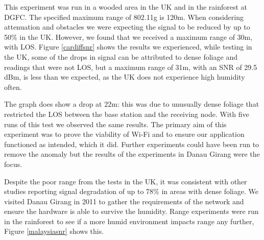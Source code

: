 This experiment was run in a wooded area in the UK and in the rainforest at DGFC. The specified maximum range of 802.11g is 120m. When considering attenuation and obstacles we were expecting the signal to be reduced by up to 50\% in the UK. However, we found that we received a maximum range of 30m, with LOS. Figure \ref{cardiffsnr} shows the results we experienced, while testing in the UK, some of the drops in signal can be attributed to dense foliage and readings that were not LOS, but a maximum range of 31m, with an SNR of 29.5 dBm, is less than we expected, as the UK does not experience high humidity often.
			
	The graph does show a drop at 22m: this was due to unusually dense foliage that restricted the LOS between the base station and the receiving node. With five runs of this test we observed the same results. The primary aim of this experiment was to prove the viability of Wi-Fi and to ensure our application functioned as intended, which it did. Further experiments could have been run to remove the anomaly but the results of the experiments in Danau Girang were the focus.
		 
	Despite the poor range from the tests in the UK, it was consistent with other studies reporting signal degradation of up to 78\% in areas with dense foliage. We visited Danau Girang in 2011 to gather the requirements of the network and ensure the hardware is able to survive the humidity. Range experiments were run in the rainforest to see if a more humid environment impacts range any further, Figure \ref{malaysiasnr} shows this.

